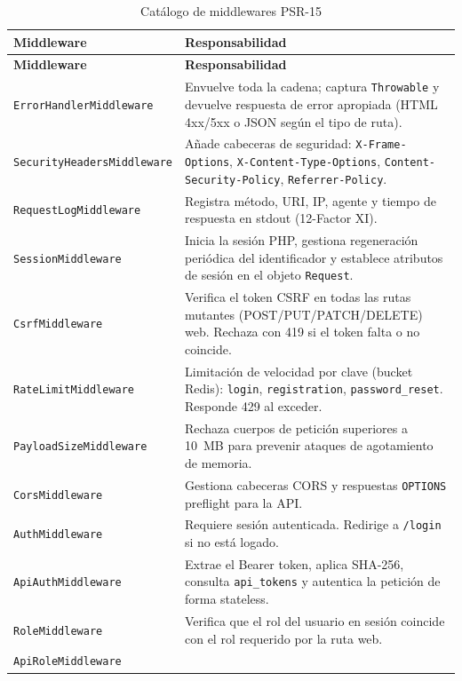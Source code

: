 \documentclass[12pt,a4paper,twoside,openright]{report}
\begin{document}
\begin{longtable}{@{}lp{7cm}@{}}
  \caption{Catálogo de middlewares PSR-15}
  \label{tab:middlewares}\\
  \toprule
  \textbf{Middleware} & \textbf{Responsabilidad}\\
  \midrule
  \endfirsthead
  \toprule
  \textbf{Middleware} & \textbf{Responsabilidad}\\
  \midrule
  \endhead
  \bottomrule
  \endfoot
  \texttt{ErrorHandlerMiddleware}
    & Envuelve toda la cadena; captura \texttt{Throwable} y devuelve respuesta
      de error apropiada (HTML 4xx/5xx o JSON según el tipo de ruta).\\
  \texttt{SecurityHeadersMiddleware}
    & Añade cabeceras de seguridad: \texttt{X-Frame-Options}, \texttt{X-Content-Type-Options},
      \texttt{Content-Security-Policy}, \texttt{Referrer-Policy}.\\
  \texttt{RequestLogMiddleware}
    & Registra método, URI, IP, agente y tiempo de respuesta en stdout (12-Factor XI).\\
  \texttt{SessionMiddleware}
    & Inicia la sesión PHP, gestiona regeneración periódica del identificador y
      establece atributos de sesión en el objeto \texttt{Request}.\\
  \texttt{CsrfMiddleware}
    & Verifica el token CSRF en todas las rutas mutantes (POST/PUT/PATCH/DELETE) web.
      Rechaza con 419 si el token falta o no coincide.\\
  \texttt{RateLimitMiddleware}
    & Limitación de velocidad por clave (bucket Redis): \texttt{login},
      \texttt{registration}, \texttt{password\_reset}. Responde 429 al exceder.\\
  \texttt{PayloadSizeMiddleware}
    & Rechaza cuerpos de petición superiores a 10~MB para prevenir ataques de
      agotamiento de memoria.\\
  \texttt{CorsMiddleware}
    & Gestiona cabeceras CORS y respuestas \texttt{OPTIONS} preflight para la API.\\
  \texttt{AuthMiddleware}
    & Requiere sesión autenticada. Redirige a \texttt{/login} si no está logado.\\
  \texttt{ApiAuthMiddleware}
    & Extrae el Bearer token, aplica SHA-256, consulta \texttt{api\_tokens} y
      autentica la petición de forma stateless.\\
  \texttt{RoleMiddleware}
    & Verifica que el rol del usuario en sesión coincide con el rol requerido
      por la ruta web.\\
  \texttt{ApiRoleMiddleware}

\end{longtable}
\end{document}
